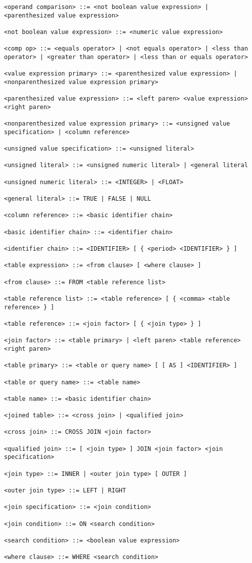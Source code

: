 \begin{lstlisting}[label=lst:dop_a,caption=диалект грамматики SQL в формате
РБНФ]
<operand comparison> ::= <not boolean value expression> | <parenthesized value expression>

<not boolean value expression> ::= <numeric value expression>

<comp op> ::= <equals operator> | <not equals operator> | <less than operator> | <greater than operator> | <less than or equals operator>

<value expression primary> ::= <parenthesized value expression> | <nonparenthesized value expression primary>

<parenthesized value expression> ::= <left paren> <value expression> <right paren>

<nonparenthesized value expression primary> ::= <unsigned value specification> | <column reference>

<unsigned value specification> ::= <unsigned literal>

<unsigned literal> ::= <unsigned numeric literal> | <general literal

<unsigned numeric literal> ::= <INTEGER> | <FLOAT>

<general literal> ::= TRUE | FALSE | NULL

<column reference> ::= <basic identifier chain>

<basic identifier chain> ::= <identifier chain>

<identifier chain> ::= <IDENTIFIER> [ { <period> <IDENTIFIER> } ]

<table expression> ::= <from clause> [ <where clause> ]

<from clause> ::= FROM <table reference list>

<table reference list> ::= <table reference> [ { <comma> <table reference> } ]

<table reference> ::= <join factor> [ { <join type> } ]

<join factor> ::= <table primary> | <left paren> <table reference> <right paren>

<table primary> ::= <table or query name> [ [ AS ] <IDENTIFIER> ]

<table or query name> ::= <table name>

<table name> ::= <basic identifier chain>

<joined table> ::= <cross join> | <qualified join>

<cross join> ::= CROSS JOIN <join factor>

<qualified join> ::= [ <join type> ] JOIN <join factor> <join specification>

<join type> ::= INNER | <outer join type> [ OUTER ] 

<outer join type> ::= LEFT | RIGHT

<join specification> ::= <join condition>

<join condition> ::= ON <search condition>

<search condition> ::= <boolean value expression>

<where clause> ::= WHERE <search condition>
\end{lstlisting}